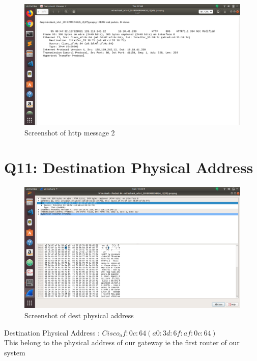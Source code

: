 \documentclass{article}
\begin{document}
  \begin{figure}[H]
 \centering
 \includegraphics[width=1.0\textwidth]{../q10/b.png}
 \caption{\label{fig:PING}Screenshot of http message 2}
 \end{figure}
 
\section{Q11: Destination Physical Address}
 \begin{figure}[H]
 \centering
 \includegraphics[width=1.0\textwidth]{../q11/a.png}
 \caption{\label{fig:PING}Screenshot of dest physical address}
 \end{figure}
 
 Destination Physical Address : \textbf{$Cisco_af:0c:64 (a0:3d:6f:af:0c:64)$}\\
 This belong to the physical address of our gateway ie the first router of our system\\
 
 
\end{document}
